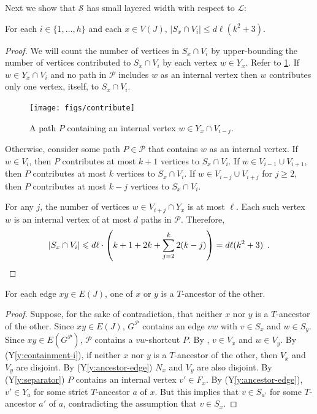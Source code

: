 \documentclass{patmorin}
\newcommand{\yref}[1]{(Y\ref{y:#1})}
\renewcommand{\ge}{\geqslant}
\renewcommand{\le}{\leqslant}
\begin{document}
Next we show that $\mathcal{S}$ has small layered width with respect to $\mathcal{L}$:

\begin{clm}
  For each $i\in\{1,\ldots,h\}$ and each $x\in V(J)$, $|S_x\cap V_i|\le d\ell(k^2+3)$.  
\end{clm}

\begin{proof}
  We will count the number of vertices in $S_x\cap V_i$ by upper-bounding the number of vertices contributed to $S_x\cap V_i$ by each vertex $w\in Y_x$. Refer to \cref{contribute}.
  If $w\in Y_x\cap V_i$ and no path in $\mathcal{P}$ includes $w$ as an internal vertex then $w$ contributes only one vertex, itself, to $S_x\cap V_i$.
  \begin{figure}
    \begin{center}
      \texttt{[image: figs/contribute]}
    \end{center}
    \caption{A path $P$ containing an internal vertex $w\in Y_x\cap V_{i-j}$.}
    \label{contribute}
  \end{figure}

  Otherwise, consider some path $P\in\mathcal{P}$ that contains $w$ as an internal vertex.  If $w\in V_{i}$, then $P$ contributes at most $k+1$ vertices to $S_x\cap V_i$.  If $w\in V_{i-1}\cup V_{i+1}$, then $P$ contributes at most $k$ vertices to $S_x\cap V_i$. If $w\in V_{i-j}\cup V_{i+j}$ for $j\ge 2$, then $P$ contributes at most $k-j$ vertices to $S_x\cap V_i$.
  
  For any $j$, the number of vertices $w\in V_{i+j}\cap Y_x$ is at most $\ell$. Each such vertex $w$ is an internal vertex of at most $d$ paths in $\mathcal{P}$. Therefore, 
  \[  |S_x\cap V_i|\le d\ell\cdot\left(k+1 + 2k + \sum_{j=2}^k 2(k-j)\right) %
      = d\ell(k^2 +3) \enspace . \qedhere
  \]
\end{proof}

\begin{clm}
  For each edge $xy\in E(J)$, one of $x$ or $y$ is a $T$-ancestor of the other.
\end{clm}

\begin{proof}
  Suppose, for the sake of contradiction, that neither $x$ nor $y$ is a $T$-ancestor of the other.  Since $xy\in E(J)$, $G^\mathcal{P}$ contains an edge $vw$ with $v\in S_x$ and $w\in S_y$.  Since $xy\in E(G^{\mathcal{P}})$,  $\mathcal{P}$ contains a $vw$-shortcut $P$.  By , $v\in V_x$ and $w\in V_y$.  By \yref{containment-i}, if neither $x$ nor $y$ is a $T$-ancestor of the other, then $V_x$ and $V_y$ are disjoint.  By \yref{ancestor-edge} $N_x$ and $V_y$ are also disjoint.  By \yref{separator} $P$ contains an internal vertex $v'\in F_x$.  By \yref{ancestor-edge}, $v'\in Y_a$ for some strict $T$-ancestor $a$ of $x$.  But this implies that $v\in S_{a'}$ for some $T$-ancestor $a'$ of $a$, contradicting the assumption that $v\in S_x$.
\end{proof}
\end{document}
